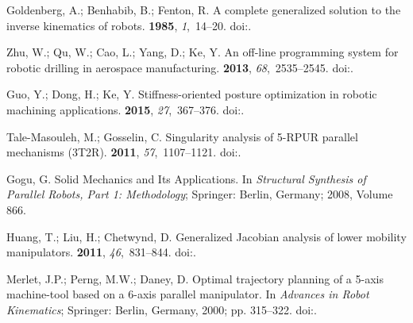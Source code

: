 \documentclass[robotics,article,accept,moreauthors,pdftex]{Definitions/mdpi}
\begin{document}
\begin{thebibliography}{999}
Goldenberg, A.; Benhabib, B.; Fenton, R.
\newblock A complete generalized solution to the inverse kinematics of robots.
 {\bf 1985}, {\em
  1},~14--20.
\newblock
  doi:{\href{https://doi.org/10.1109/JRA.1985.1086995}{}}.

Zhu, W.; Qu, W.; Cao, L.; Yang, D.; Ke, Y.
\newblock An off-line programming system for robotic drilling in aerospace
  manufacturing.
  {\bf 2013}, {\em 68},~2535--2545.
\newblock
  doi:{\href{https://doi.org/10.1007/s00170-013-4873-5}{}}.

Guo, Y.; Dong, H.; Ke, Y.
\newblock Stiffness-oriented posture optimization in robotic machining
  applications.
 {\bf
  2015}, {\em 27},~367--376.
\newblock
  doi:{\href{https://doi.org/10.1016/j.rcim.2015.02.006}{}}.

Tale-Masouleh, M.; Gosselin, C.
\newblock Singularity analysis of 5-RPUR parallel mechanisms (3T2R).
  {\bf 2011}, {\em 57},~1107--1121.
\newblock
  doi:{\href{https://doi.org/10.1007/s00170-011-3349-8}{}}.

Gogu, G.
\newblock Solid Mechanics and Its Applications. In {\em Structural Synthesis of Parallel Robots, Part 1: Methodology}; Springer: Berlin, Germany; 2008, Volume 866.

Huang, T.; Liu, H.; Chetwynd, D.
\newblock Generalized Jacobian analysis of lower mobility manipulators.
 {\bf 2011}, {\em 46},~831--844.
\newblock
  doi:{\href{https://doi.org/10.1016/j.mechmachtheory.2011.01.009}{}}.

Merlet, J.P.; Perng, M.W.; Daney, D.
\newblock Optimal trajectory planning of a 5-axis machine-tool based on a
  6-axis parallel manipulator. In {\em Advances in Robot Kinematics}; Springer: Berlin, Germany, 2000; pp. 315--322.
\newblock
  doi:{\href{https://doi.org/10.1007/978-94-011-4120-8_33}{}}.


\end{thebibliography}
\end{document}
